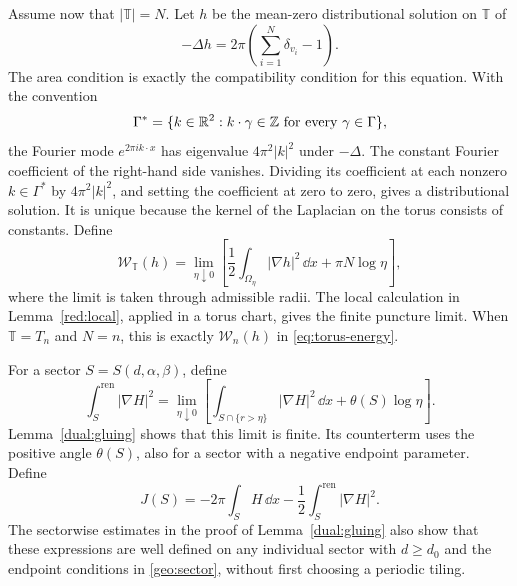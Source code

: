 Assume now that \(|\mathbb T|=N\). Let \(h\) be the mean-zero
distributional solution on \(\mathbb T\) of
\begin{equation}\label{dual:torus-potential}
 -\Delta h=2\pi\left(\sum_{i=1}^N\delta_{v_i}-1\right).
\end{equation}
The area condition is exactly the compatibility condition for this
equation. With the convention
\[
 \Gamma^*=\{k\in\mathbb R^2:k\cdot\gamma\in\mathbb Z
                     \text{ for every }\gamma\in\Gamma\},
\]
the Fourier mode \(e^{2\pi i k\cdot x}\) has eigenvalue
\(4\pi^2|k|^2\) under \(-\Delta\). The constant Fourier coefficient
of the right-hand side vanishes. Dividing its coefficient
at each nonzero \(k\in\Gamma^*\) by \(4\pi^2|k|^2\), and setting the
coefficient at zero to zero, gives a distributional solution. It is
unique because the kernel of the Laplacian on the torus consists of
constants. Define
\begin{equation}\label{dual:torus-energy}
 \mathcal W_{\mathbb T}(h)=\lim_{\eta\downarrow0}
 \left[
 \frac12\int_{\Omega_\eta}|\nabla h|^2\,\dd x+\pi N\log\eta
 \right],
\end{equation}
where the limit is taken through admissible radii. The local calculation
in Lemma~\ref{red:local}, applied in a torus chart, gives the finite
puncture limit. When \(\mathbb T=T_n\) and \(N=n\), this is exactly
\(\mathcal W_n(h)\) in \eqref{eq:torus-energy}.

For a sector \(S=S(d,\alpha,\beta)\), define
\begin{equation}
 \int_S^{\mathrm{ren}}|\nabla H|^2
 =\lim_{\eta\downarrow0}\left[
   \int_{S\cap\{r>\eta\}}|\nabla H|^2\,\dd x
                         +\theta(S)\log\eta\right].
 \label{dual:sector-ren}
\end{equation}
Lemma~\ref{dual:gluing} shows that this limit is finite.
Its counterterm uses the positive angle \(\theta(S)\), also
for a sector with a negative endpoint parameter.  Define
\begin{equation}
 J(S)=-2\pi\int_S H\,\dd x
             -\frac12\int_S^{\mathrm{ren}}|\nabla H|^2.
 \label{dual:sector-functional}
\end{equation}
The sectorwise estimates in the proof of Lemma~\ref{dual:gluing} also
show that these expressions are well defined on any individual sector
with \(d\geq d_0\) and the endpoint conditions in \eqref{geo:sector},
without first choosing a periodic tiling.

